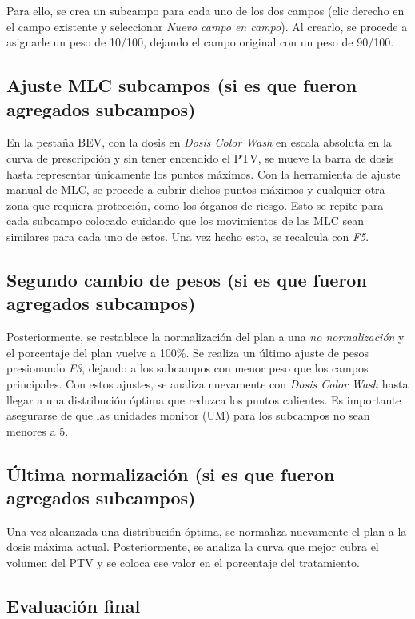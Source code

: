 \documentclass{article}
\begin{document}
Para ello, se crea un subcampo para cada uno de los dos campos (clic derecho en el campo existente y seleccionar \textit{Nuevo campo en campo}). Al crearlo, se procede a asignarle un peso de 10/100, dejando el campo original con un peso de 90/100.

\subsection{Ajuste MLC subcampos (si es que fueron agregados subcampos)}

En la pestaña BEV, con la dosis en \textit{Dosis Color Wash} en escala absoluta en la curva de prescripción y sin tener encendido el PTV, se mueve la barra de dosis hasta representar únicamente los puntos máximos. Con la herramienta de ajuste manual de MLC, se procede a cubrir dichos puntos máximos y cualquier otra zona que requiera protección, como los órganos de riesgo. Esto se repite para cada subcampo colocado cuidando que los movimientos de las MLC sean similares para cada uno de estos. Una vez hecho esto, se recalcula con \textit{F5}.

\subsection{Segundo cambio de pesos (si es que fueron agregados subcampos)}

Posteriormente, se restablece la normalización del plan a una \textit{no normalización} y el porcentaje del plan vuelve a 100\%. Se realiza un último ajuste de pesos presionando \textit{F3}, dejando a los subcampos con menor peso que los campos principales. Con estos ajustes, se analiza nuevamente con \textit{Dosis Color Wash} hasta llegar a una distribución óptima que reduzca los puntos calientes. Es importante asegurarse de que las unidades monitor (UM) para los subcampos no sean menores a 5.

\subsection{Última normalización (si es que fueron agregados subcampos)}

Una vez alcanzada una distribución óptima, se normaliza nuevamente el plan a la dosis máxima actual. Posteriormente, se analiza la curva que mejor cubra el volumen del PTV y se coloca ese valor en el porcentaje del tratamiento.

\subsection{Evaluación final}
\end{document}
